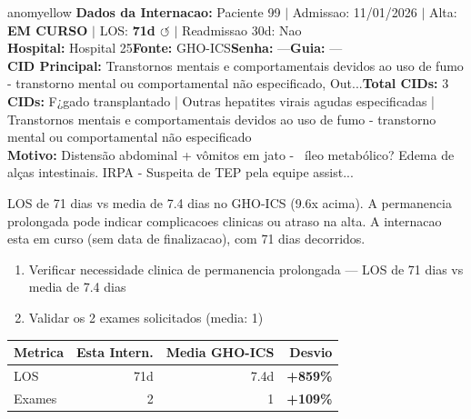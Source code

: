 \documentclass[a4paper,10pt]{article}
\begin{document}
\begin{anomalycard}[Internacao 47 | GHO-ICS | MODERADO (z=2.69)]{anomyellow}
\textbf{Dados da Internacao:} Paciente 99 $\mid$ Admissao: 11/01/2026 $\mid$ Alta: \textcolor{anomorange}{\textbf{EM CURSO}} $\mid$ LOS: \textbf{71d \textcolor{anomorange}{$\circlearrowleft$}} $\mid$ Readmissao 30d: Nao\\
\textbf{Hospital:} Hospital 25\quad\textbf{Fonte:} GHO-ICS\quad\textbf{Senha:} ---\quad\textbf{Guia:} ---\\
\textbf{CID Principal:} {\small Transtornos mentais e comportamentais devidos ao uso de fumo - transtorno mental ou comportamental não especificado, Out...}\quad\textbf{Total CIDs:} 3\\

\textbf{CIDs:} {\scriptsize F¿gado transplantado | Outras hepatites virais agudas especificadas | Transtornos mentais e comportamentais devidos ao uso de fumo - transtorno mental ou comportamental não especificado}\\

\textbf{Motivo:} {\scriptsize Distensão abdominal + vômitos em jato -  íleo metabólico? Edema de alças intestinais. IRPA - Suspeita de TEP pela equipe assist...}\\

\vspace{2pt}\begin{tcolorbox}[colback=severityred!20,colframe=anomyellow,title={\textbf{Interpretacao de Negocio}},fonttitle=\bfseries\small,left=4pt,right=4pt,top=3pt,bottom=3pt]
{\small LOS de 71 dias vs media de 7.4 dias no GHO-ICS (9.6x acima). A permanencia prolongada pode indicar complicacoes clinicas ou atraso na alta. A internacao esta em curso (sem data de finalizacao), com 71 dias decorridos.}
\end{tcolorbox}
\begin{tcolorbox}[colback=severityyellow!30,colframe=anomorange,title={\textbf{Recomendacoes Especificas}},fonttitle=\bfseries\small,left=4pt,right=4pt,top=3pt,bottom=3pt]
\begin{enumerate}[nosep,leftmargin=16pt]
\item {\small Verificar necessidade clinica de permanencia prolongada --- LOS de 71 dias vs media de 7.4 dias}
\item {\small Validar os 2 exames solicitados (media: 1)}
\end{enumerate}
\end{tcolorbox}
\begin{center}\begin{tabular}{l r r r}\toprule\textbf{Metrica} & \textbf{Esta Intern.} & \textbf{Media GHO-ICS} & \textbf{Desvio} \\\midrule
LOS & 71d & 7.4d & \textcolor{anomred}{\textbf{+859\%}} \\
Exames & 2 & 1 & \textcolor{anomred}{\textbf{+109\%}} \\
\bottomrule\end{tabular}\end{center}


\end{anomalycard}
\end{document}
